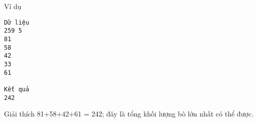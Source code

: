Ví dụ  
\begin{verbatim}
Dữ liệu
259 5
81
58
42
33
61

Kết quả
242
\end{verbatim}
   Giải thích  
81+58+42+61 = 242; đây là tổng khối lượng bò lớn nhất có thể được.